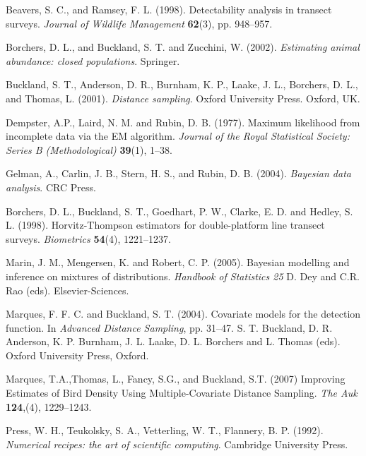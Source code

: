 \documentclass{report}
\begin{document}
\begin{thebibliography}{}

\bibitem{ } Beavers, S. C., and Ramsey, F. L. (1998). Detectability analysis in transect surveys. \textit{Journal of Wildlife Management} \textbf{62}(3), pp. 948--957.

\bibitem{} Borchers, D. L., and Buckland, S. T. and Zucchini, W. (2002). \textit{Estimating animal abundance: closed populations}. Springer.

\bibitem{ }  Buckland, S. T., Anderson, D. R., Burnham, K. P., Laake, J. L., Borchers, D. L., and Thomas, L.  (2001). \textit{Distance sampling}. Oxford University Press. Oxford, UK.

\bibitem{ } Dempster, A.P., Laird,  N. M. and Rubin, D. B. (1977). Maximum likelihood from incomplete data via the EM algorithm. \textit{Journal of the Royal Statistical Society: Series B (Methodological)} \textbf{39}(1), 1--38.

\bibitem{ }  Gelman, A., Carlin, J. B., Stern, H. S., and Rubin, D. B. (2004). \textit{Bayesian data analysis}. CRC Press.

\bibitem{} Borchers, D. L., Buckland, S. T., Goedhart, P. W., Clarke, E. D. and Hedley, S. L. (1998). Horvitz-Thompson estimators for double-platform line transect surveys. \textit{Biometrics} \textbf{54}(4), 1221--1237.

\bibitem{ } Marin, J. M., Mengersen, K. and Robert, C. P. (2005). Bayesian modelling and inference on mixtures of distributions. \textit{Handbook of Statistics 25} D. Dey and C.R. Rao (eds). Elsevier-Sciences.

\bibitem{ } Marques, F. F. C. and Buckland, S. T. (2004). Covariate models for the detection function. In \textit{Advanced Distance Sampling}, pp. 31--47. S. T. Buckland, D. R. Anderson, K. P. Burnham, J. L. Laake, D. L. Borchers and L. Thomas (eds). Oxford University Press, Oxford.

\bibitem{ } Marques, T.A.,Thomas, L., Fancy, S.G., and Buckland, S.T. (2007) Improving Estimates of Bird Density Using Multiple-Covariate Distance Sampling. \textit{The Auk} \textbf{124},(4), 1229--1243.

\bibitem{ } Press, W. H., Teukolsky, S. A., Vetterling, W. T., Flannery, B. P. (1992). \textit{Numerical recipes: the art of scientific computing}. Cambridge University Press. 

\end{thebibliography}
\end{document}

